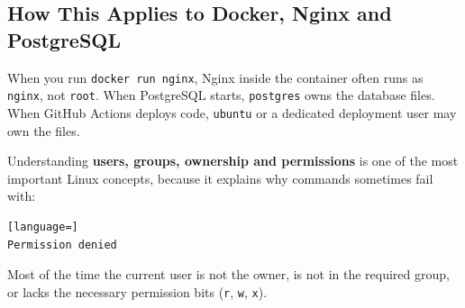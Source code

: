 \documentclass[11pt,a4paper]{article}
\begin{document}
\subsection{How This Applies to Docker, Nginx and PostgreSQL}

When you run \lstinline|docker run nginx|, Nginx inside the container often runs as
\texttt{nginx}, not \texttt{root}. When PostgreSQL starts, \texttt{postgres} owns the
database files. When GitHub Actions deploys code, \texttt{ubuntu} or a dedicated deployment
user may own the files.

Understanding \textbf{users, groups, ownership and permissions} is one of the most important
Linux concepts, because it explains why commands sometimes fail with:

\begin{lstlisting}[language=]
Permission denied
\end{lstlisting}

Most of the time the current user is not the owner, is not in the required group, or lacks
the necessary permission bits (\texttt{r}, \texttt{w}, \texttt{x}).
\end{document}
